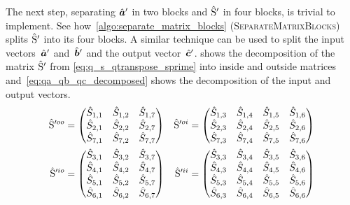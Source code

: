 The next step, separating $\hat{\bm{a}}'$ in two blocks and $\hat{\mathrm{S}}'$ in four blocks, is trivial to implement.
See how~\cref{algo:separate_matrix_blocks}
(\textsc{SeparateMatrixBlocks}) splits $\hat{\mathrm{S}}'$ into its four blocks.
A similar technique can be used to split
the input vectors~$\hat{\bm{a}}'$ and~$\hat{\bm{b}}'$ and
the output vector~$\hat{\bm{c}}'$.
 shows the decomposition
of the matrix $\hat{\mathrm{S}}'$ from \cref{eq:q_s_qtranspose_sprime}
into inside and outside matrices
and~\cref{eq:qa_qb_qc_decomposed} shows the decomposition of
the input and output vectors.
\begin{equation}
    \begin{aligned}
    \hat{\mathrm{S}}'^{oo}
    &=
    \begin{pmatrix}
        \hat{S}_{1,1} & \hat{S}_{1,2} & \hat{S}_{1,7} \\
        \hat{S}_{2,1} & \hat{S}_{2,2} & \hat{S}_{2,7} \\
        \hat{S}_{7,1} & \hat{S}_{7,2} & \hat{S}_{7,7} \\
    \end{pmatrix}
    &
    \hat{\mathrm{S}}'^{oi}
    &=
    \begin{pmatrix}
        \hat{S}_{1,3} & \hat{S}_{1,4} & \hat{S}_{1,5} & \hat{S}_{1,6} \\
        \hat{S}_{2,3} & \hat{S}_{2,4} & \hat{S}_{2,5} & \hat{S}_{2,6} \\
        \hat{S}_{7,3} & \hat{S}_{7,4} & \hat{S}_{7,5} & \hat{S}_{7,6} \\
    \end{pmatrix}
    \\
    \hat{\mathrm{S}}'^{io}
    &=
    \begin{pmatrix}
        \hat{S}_{3,1} & \hat{S}_{3,2} & \hat{S}_{3,7} \\
        \hat{S}_{4,1} & \hat{S}_{4,2} & \hat{S}_{4,7} \\
        \hat{S}_{5,1} & \hat{S}_{5,2} & \hat{S}_{5,7} \\
        \hat{S}_{6,1} & \hat{S}_{6,2} & \hat{S}_{6,7} \\
    \end{pmatrix}
    &
    \hat{\mathrm{S}}'^{ii}
    &=
    \begin{pmatrix}
        \hat{S}_{3,3} & \hat{S}_{3,4} & \hat{S}_{3,5} & \hat{S}_{3,6} \\
        \hat{S}_{4,3} & \hat{S}_{4,4} & \hat{S}_{4,5} & \hat{S}_{4,6} \\
        \hat{S}_{5,3} & \hat{S}_{5,4} & \hat{S}_{5,5} & \hat{S}_{5,6} \\
        \hat{S}_{6,3} & \hat{S}_{6,4} & \hat{S}_{6,5} & \hat{S}_{6,6} \\
    \end{pmatrix}
    \end{aligned}
    \label{eq:q_s_qtranspose_sprime_decomposed}
\end{equation}
